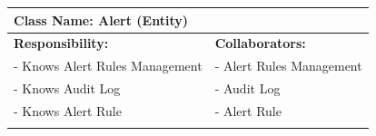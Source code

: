 {	\begin{table}[H]
		\centering
		\begin{tabular}{|p{8cm}|p{8cm}|}
		\hline 
		 \multicolumn{2}{|l|}{\textbf{Class Name:} Alert (Entity)} \\
		\hline
		\textbf{Responsibility:} & \textbf{Collaborators:} \\
		\hline
		 - Knows Alert Rules Management & - Alert Rules Management \\
		 - Knows Audit Log & - Audit Log \\
		 - Knows Alert Rule & - Alert Rule \\
		\vspace{1in} & \\
		\hline
		\end{tabular}
	\end{table}
}
